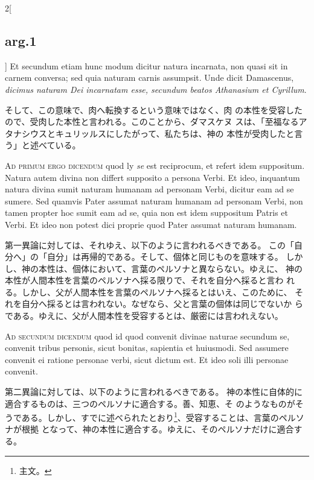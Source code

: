 \documentclass[paper=a4paper,fontsize=10pt,jafontsize=9pt,titlepage]{jlreq}
\begin{document}
\begin{paracol}{2}[\subsection{arg.1}]
Et secundum etiam hunc modum
 dicitur natura incarnata, non quasi sit in carnem conversa; sed quia
 naturam carnis assumpsit. Unde dicit Damascenus, {\itshape dicimus naturam Dei
 incarnatam esse, secundum beatos Athanasium et Cyrillum}.

\switchcolumn

そして、この意味で、肉へ転換するという意味ではなく、肉
 の本性を受容したので、受肉した本性と言われる。このことから、ダマスケヌ
 スは、「至福なるアタナシウスとキュリッルスにしたがって、私たちは、神の
 本性が受肉したと言う」と述べている。

\switchcolumn*[\subsection{ad.1}]

{\scshape Ad primum ergo dicendum} quod ly {\slshape se} est reciprocum, et refert idem
 suppositum. Natura autem divina non differt supposito a persona
 Verbi. Et ideo, inquantum natura divina sumit naturam humanam ad
 personam Verbi, dicitur eam ad se sumere. Sed quamvis Pater assumat
 naturam humanam ad personam Verbi, non tamen propter hoc sumit eam ad
 se, quia non est idem suppositum Patris et Verbi. Et ideo non potest
 dici proprie quod Pater assumat naturam humanam.

\switchcolumn

第一異論に対しては、それゆえ、以下のように言われるべきである。
この「自分へ」の「自分」は再帰的である。そして、個体と同じものを意味する。
 しかし、神の本性は、個体において、言葉のペルソナと異ならない。ゆえに、
 神の本性が人間本性を言葉のペルソナへ採る限りで、それを自分へ採ると言わ
 れる。しかし、父が人間本性を言葉のペルソナへ採るとはいえ、このために、
 それを自分へ採るとは言われない。なぜなら、父と言葉の個体は同じでないか
 らである。ゆえに、父が人間本性を受容するとは、厳密には言われえない。

\switchcolumn*[\subsection{ad.2}]

{\scshape Ad secundum dicendum} quod id quod convenit divinae naturae secundum se,
 convenit tribus personis, sicut bonitas, sapientia et huiusmodi. Sed
 assumere convenit ei ratione personae verbi, sicut dictum est. Et ideo
 soli illi personae convenit.

\switchcolumn

第二異論に対しては、以下のように言われるべきである。
神の本性に自体的に適合するものは、三つのペルソナに適合する。善、知恵、そ
 のようなものがそうである。しかし、すでに述べられたとおり\footnote{主文。}、受容することは、言葉のペルソナが根拠
 となって、神の本性に適合する。ゆえに、そのペルソナだけに適合する。


\end{paracol}
\end{document}
